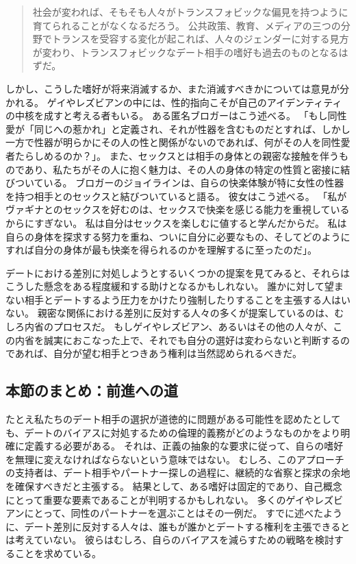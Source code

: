 \documentclass[paper=a4,book,openany]{jlreq}
\begin{document}
\begin{quote}
  社会が変われば、そもそも人々がトランスフォビックな偏見を持つように育てられることがなくなるだろう。
公共政策、教育、メディアの三つの分野でトランスを受容する変化が起これば、人々のジェンダーに対する見方が変わり、トランスフォビックなデート相手の嗜好も過去のものとなるはずだ。
\citep{green17:_to_be_effec}
\end{quote}

しかし、こうした嗜好が将来消滅するか、また消滅すべきかについては意見が分かれる。
ゲイやレズビアンの中には、性的指向こそが自己のアイデンティティの中核を成すと考える者もいる。
ある匿名ブロガーはこう述べる。
「もし同性愛が「同じへの惹かれ」と定義され、それが性器を含むものだとすれば、しかし一方で性器が明らかにその人の性と関係がないのであれば、何がその人を同性愛者たらしめるのか？」\citep{soldier17:_no_havin_genit}。
また、セックスとは相手の身体との親密な接触を伴うものであり、私たちがその人に抱く魅力は、その人の身体の特定の性質と密接に結びついている。
ブロガーのジョイラインは、自らの快楽体験が特に女性の性器を持つ相手とのセックスと結びついていると語る。
彼女はこう述べる。
「私がヴァギナとのセックスを好むのは、セックスで快楽を感じる能力を重視しているからにすぎない。
私は自分はセックスを楽しむに値すると学んだからだ。
私は自らの身体を探求する努力を重ね、ついに自分に必要なもの、そしてどのようにすれば自分の身体が最も快楽を得られるのかを理解するに至ったのだ」\citep{maenzanise19:_i_dont_find_piv_sex}。

デートにおける差別に対処しようとするいくつかの提案を見てみると、それらはこうした懸念をある程度緩和する助けとなるかもしれない。
誰かに対して望まない相手とデートするよう圧力をかけたり強制したりすることを主張する人はいない。
親密な関係における差別に反対する人々の多くが提案しているのは、むしろ内省のプロセスだ。
もしゲイやレズビアン、あるいはその他の人々が、この内省を誠実におこなった上で、それでも自分の選好は変わらないと判断するのであれば、自分が望む相手とつきあう権利は当然認められるべきだ。

\subsection{本節のまとめ：前進への道}

たとえ私たちのデート相手の選択が道徳的に問題がある可能性を認めたとしても、デートのバイアスに対処するための倫理的義務がどのようなものかをより明確に定義する必要がある。
それは、正義の抽象的な要求に従って、自らの嗜好を無理に変えなければならないという意味ではない。
むしろ、このアプローチの支持者は、デート相手やパートナー探しの過程に、継続的な省察と探求の余地を確保すべきだと主張する。
結果として、ある嗜好は固定的であり、自己概念にとって重要な要素であることが判明するかもしれない。
多くのゲイやレズビアンにとって、同性のパートナーを選ぶことはその一例だ。
すでに述べたように、デート差別に反対する人々は、誰もが誰かとデートする権利を主張できるとは考えていない。
彼らはむしろ、自らのバイアスを減らすための戦略を検討することを求めている。
\end{document}
